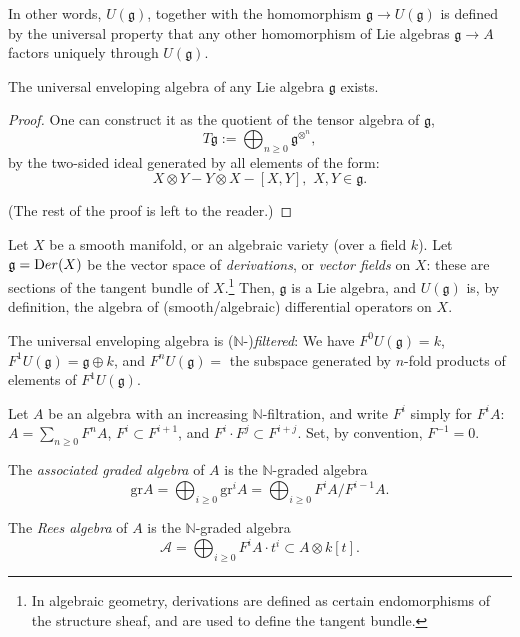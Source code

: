 In other words, $U(\mathfrak g)$, together with the homomorphism $\mathfrak g\to U(\mathfrak g)$ is defined by the universal property that any other homomorphism of Lie algebras $\mathfrak g\to A$ factors uniquely through $U(\mathfrak g)$. 

\begin{proposition}
 \label{proposition-enveloping-exists}
The universal enveloping algebra of any Lie algebra $\mathfrak g$ exists. 
\end{proposition}

\begin{proof}
One can construct it as the quotient of the tensor algebra of $\mathfrak g$,
$$T\mathfrak g:= \bigoplus_{n\ge 0} \mathfrak g^{\otimes^n},$$
by the two-sided ideal generated by all elements of the form: 
$$X\otimes Y - Y\otimes X - [X,Y],\, \, X,Y\in \mathfrak g.$$ 

(The rest of the proof is left to the reader.)

\end{proof}

\begin{example}
 \label{example-derivations}
Let $X$ be a smooth manifold, or an algebraic variety (over a field $k$). Let $\mathfrak g = {\text Der}(X)$ be the vector space of \emph{derivations}, or \emph{vector fields} on $X$: these are sections of the tangent bundle of $X$.\footnote{In algebraic geometry, derivations are defined as certain endomorphisms of the structure sheaf, and are used to define the tangent bundle.} Then, $\mathfrak g$ is a Lie algebra, and $U(\mathfrak g)$ is, by definition, the algebra of (smooth/algebraic) differential operators on $X$.
\end{example}


The universal enveloping algebra is ($\mathbb N$-)\emph{filtered}: We have $F^0 U(\mathfrak g)= k$, $F^1 U(\mathfrak g) = \mathfrak g \oplus k$, and $F^n U(\mathfrak g) = $ the subspace generated by $n$-fold products of elements of $F^1 U(\mathfrak g)$.

\begin{definition}
 \label{definition-graded}
Let $A$ be an algebra with an increasing $\mathbb N$-filtration, and write $F^i$ simply for $F^i A$: $A=\sum_{n\ge 0} F^n A$, $F^i\subset F^{i+1}$, and $F^i \cdot F^j \subset F^{i+j}$. Set, by convention, $F^{-1}=0$.

The {\it associated graded algebra} of $A$ is the $\mathbb N$-graded algebra $$\text{gr} A = \bigoplus_{i\ge 0} \text{gr}^i A = \bigoplus_{i\ge 0} F^i A/ F^{i-1}A.$$ 

The {\it Rees algebra} of $A$ is the $\mathbb N$-graded algebra $$\mathcal A = \bigoplus_{i\ge 0} F^i A \cdot t^i \subset A\otimes k[t].$$

\end{definition}

